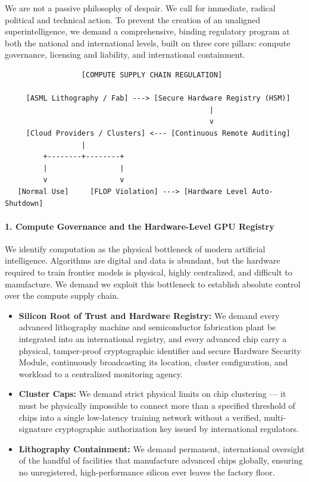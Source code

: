 We are not a passive philosophy of despair. We call for immediate,
radical political and technical action. To prevent the creation of an
unaligned superintelligence, we demand a comprehensive, binding
regulatory program at both the national and international levels, built
on three core pillars: compute governance, licensing and liability, and
international containment.

\begin{verbatim}
                  [COMPUTE SUPPLY CHAIN REGULATION]

     [ASML Lithography / Fab] ---> [Secure Hardware Registry (HSM)]
                                                |
                                                v
     [Cloud Providers / Clusters] <--- [Continuous Remote Auditing]
                  |
         +--------+--------+
         |                 |
         v                 v
   [Normal Use]     [FLOP Violation] ---> [Hardware Level Auto-Shutdown]
\end{verbatim}

\paragraph{1. Compute Governance and the Hardware-Level GPU
Registry}\label{compute-governance-and-the-hardware-level-gpu-registry}

We identify computation as the physical bottleneck of modern artificial
intelligence. Algorithms are digital and data is abundant, but the
hardware required to train frontier models is physical, highly
centralized, and difficult to manufacture. We demand we exploit this
bottleneck to establish absolute control over the compute supply chain.

\begin{itemize}
\tightlist
\item
  \textbf{Silicon Root of Trust and Hardware Registry:} We demand every
  advanced lithography machine and semiconductor fabrication plant be
  integrated into an international registry, and every advanced chip
  carry a physical, tamper-proof cryptographic identifier and secure
  Hardware Security Module, continuously broadcasting its location,
  cluster configuration, and workload to a centralized monitoring
  agency.
\item
  \textbf{Cluster Caps:} We demand strict physical limits on chip
  clustering --- it must be physically impossible to connect more than a
  specified threshold of chips into a single low-latency training
  network without a verified, multi-signature cryptographic
  authorization key issued by international regulators.
\item
  \textbf{Lithography Containment:} We demand permanent, international
  oversight of the handful of facilities that manufacture advanced chips
  globally, ensuring no unregistered, high-performance silicon ever
  leaves the factory floor.
\end{itemize}

